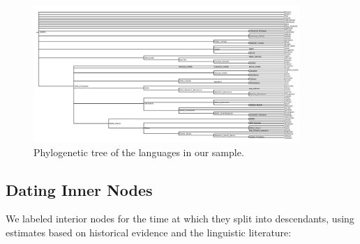 \documentclass[11pt,a4paper]{article}
\begin{document}
\begin{figure}
    \centering
	\includegraphics[width=0.9\textwidth]{../trees/tree.png}
       \caption{Phylogenetic tree of the languages in our sample.}
    \label{fig:tree}
\end{figure}




\subsection{Dating Inner Nodes}
We labeled interior nodes for the time at which they split into descendants, using estimates based on historical evidence and the linguistic literature:


\end{document}
